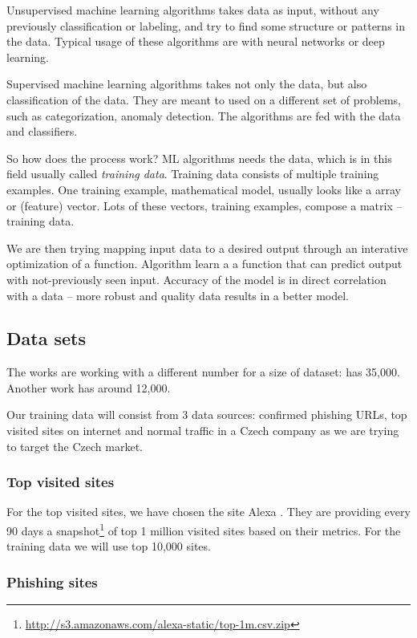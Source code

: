 \documentclass[
  digital, %
  oneside, %
  table,   %
  nolof,     %
  nolot,     %
]{fithesis3}
\newcounter{feature}
\begin{document}
Unsupervised machine learning algorithms takes data as input, without any previously classification or labeling, and try to find some structure or patterns in the data. Typical usage of these algorithms are with neural networks or deep learning.

Supervised machine learning algorithms takes not only the data, but also classification of the data. They are meant to used on a different set of problems, such as categorization, anomaly detection. The algorithms are fed with the data and classifiers.

So how does the process work? ML algorithms needs the data, which is in this field usually called \textit{training data}. Training data consists of multiple training examples. One training example, mathematical model, usually looks like a array or (feature) vector. Lots of these vectors, training examples, compose a matrix -- training data. 

We are then trying mapping input data to a desired output through an interative optimization of a function. Algorithm learn a a function that can predict output with not-previously seen input. Accuracy of the model is in direct correlation with a data -- more robust and quality data results in a better model.



\subsection{Data sets}

The works are working with a different number for a size of dataset: \cite{fresh-phish} has 35,000. Another work has around 12,000.

Our training data will consist from 3 data sources: confirmed phishing URLs, top visited sites on internet and normal traffic in a Czech company as we are trying to target the Czech market. 

\subsubsection{Top visited sites}

For the top visited sites, we have chosen the site Alexa \cite{alexa}. They are providing every 90 days a snapshot\footnote{\url{http://s3.amazonaws.com/alexa-static/top-1m.csv.zip}} of top 1 million visited sites based on their metrics. For the training data we will use top 10,000 sites.

\subsubsection{Phishing sites}
\end{document}
